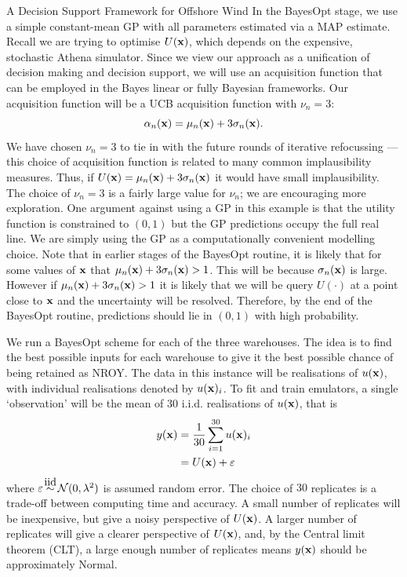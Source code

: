 \begin{chapter}{A Decision Support Framework for Offshore Wind \label{Ch:ds-for-ow}}
In the BayesOpt stage, we use a simple constant-mean GP with all parameters estimated via a MAP estimate. Recall we are trying to optimise $U(\mathbf{x})$, which depends on the expensive, stochastic Athena simulator. Since we view our approach as a unification of decision making and decision support, we will use an acquisition function that can be employed in the Bayes linear or fully Bayesian frameworks. Our acquisition function will be a UCB acquisition function with $\nu_n = 3$:
\begin{equation}
 \alpha_n(\mathbf{x}) = \mu_n(\mathbf{x}) + 3 \sigma_n(\mathbf{x}).
\end{equation}
We have chosen $\nu_n = 3$ to tie in with the future rounds of iterative refocussing --- this choice of acquisition function is related to many common implausibility measures. Thus, if $U(\mathbf{x}) = \mu_n(\mathbf{x}) + 3 \sigma_n(\mathbf{x})$ it would have small implausibility. The choice of $\nu_n = 3$ is a fairly large value for $\nu_n$; we are encouraging more exploration. One argument against using a GP in this example is that the utility function is constrained to $(0,1)$ but the GP predictions occupy the full real line. We are simply using the GP as a computationally convenient modelling choice. Note that in earlier stages of the BayesOpt routine, it is likely that for some values of $\mathbf{x}$ that $\mu_n(\mathbf{x}) + 3 \sigma_n(\mathbf{x}) > 1$. This will be because $\sigma_n(\mathbf{x})$ is large. However if $\mu_n(\mathbf{x}) + 3 \sigma_n(\mathbf{x}) > 1$ it is likely that we will be query $U(\cdot)$ at a point close to $\mathbf{x}$ and the uncertainty will be resolved. Therefore, by the end of the BayesOpt routine, predictions should lie in $(0,1)$ with high probability.

We run a BayesOpt scheme for each of the three warehouses. The idea is to find the best possible inputs for each warehouse to give it the best possible chance of being retained as NROY. The data in this instance will be realisations of $u(\mathbf{x})$, with individual realisations denoted by $u(\mathbf{x})_i$. To fit and train emulators, a single `observation' will be the mean of $30$ i.i.d. realisations of $u(\mathbf{x})$, that is
\begin{align}
 y(\mathbf{x}) &= \frac{1}{30} \sum_{i = 1}^{30} u(\mathbf{x})_i\\
   & = U(\mathbf{x}) + \varepsilon
\end{align}
where $\varepsilon \iid \mathcal{N}(0, \lambda^2)$ is assumed random error. The choice of $30$ replicates is a trade-off between computing time and accuracy. A small number of replicates will be inexpensive, but give a noisy perspective of $U(\mathbf{x})$. A larger number of replicates will give a clearer perspective of $U(\mathbf{x})$, and, by the Central limit theorem (CLT), a large enough number of replicates means $y(\mathbf{x})$ should be approximately Normal.


\end{chapter}
